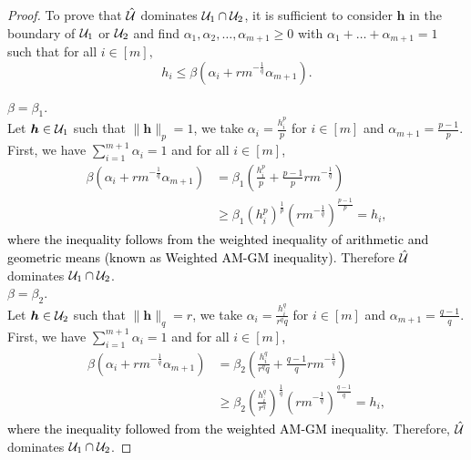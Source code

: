 \documentclass[11pt]{article}
\theoremstyle{plain}
\theoremstyle{definition}
\numberwithin{equation}{section}%
\numberwithin{equation}{section}%
\newcommand{\mb}[1]{\ensuremath{\boldsymbol{#1}}}
\newcommand*{\red}{\textcolor{black}}
\begin{document}
\begin{proof}
To prove that $\hat{ \cal U}$ dominates ${\cal U}_1 \cap { \cal U}_2$, it is sufficient to consider $\mb h$ in the boundary of ${\cal U}_1$ or ${ \cal U}_2$  and find $ \alpha_1, \alpha_2,\ldots,\alpha_{m+1} \geq 0$  with $\alpha_1+ \ldots+\alpha_{m+1} =1$ such that for all $ i \in [m],$
$$h_i \leq \beta \left( \alpha_i + rm^{-\frac{1}{q}}\alpha_{m+1}\right).$$

\vspace{2mm}
 $\beta = \beta_1.$\\
Let $ \mb h \in {\cal U}_1$ such that $\| \mb h\|_p=1$, we take $\alpha_i = \frac{h_i^p}{p}$ for $ i \in [m]$ and $\alpha_{m+1}= \frac{p-1}{p}.$ First, we have $\sum_{i=1}^{m+1} \alpha_i =1$ and for all $ i \in [m]$,
\begin{align*}
 \beta \left( \alpha_i +rm^{-\frac{1}{q}}\alpha_{m+1}\right) &=  \beta_1 \left( \frac{h_i^p}{p}+ \frac{p-1}{p} rm^{-\frac{1}{q}} \right)\\
 & \geq \beta_1  \left( h_i^p \right)^{\frac{1}{p}} \left(r m^{-\frac{1}{q}}\right)^{\frac{p-1}{p}} = h_i,
\end{align*}
\red{where the inequality follows from the weighted inequality of arithmetic and geometric means (known as Weighted AM-GM inequality)}. Therefore $\hat{ \cal U}$ dominates ${\cal U}_1 \cap { \cal U}_2 $. \\

\vspace{2mm}
 $\beta = \beta_2.$\\
Let $ \mb h \in {\cal U}_2$ such that $\| \mb h\|_q=r$, we take $\alpha_i = \frac{h_i^q}{r^q q}$ for $ i \in [m]$ and $\alpha_{m+1}= \frac{q-1}{q}.$ First, we have $\sum_{i=1}^{m+1} \alpha_i =1$ and for all $ i \in [m]$,
\begin{align*}
 \beta \left( \alpha_i +rm^{-\frac{1}{q}}\alpha_{m+1}\right) &=  \beta_2 \left( \frac{h_i^q}{r^q q}+ \frac{q-1}{q} rm^{-\frac{1}{q}} \right)\\
 & \geq \beta_2  \left( \frac{h_i^q}{r^q} \right)^{\frac{1}{q}} \left(r m^{-\frac{1}{q}}\right)^{\frac{q-1}{q}} = h_i,
\end{align*}
\red{where the inequality followed from the weighted AM-GM inequality}. Therefore, $\hat{ \cal U}$ dominates ${\cal U}_1\cap{ \cal U}_2 $.
 \end{proof}
\end{document}
